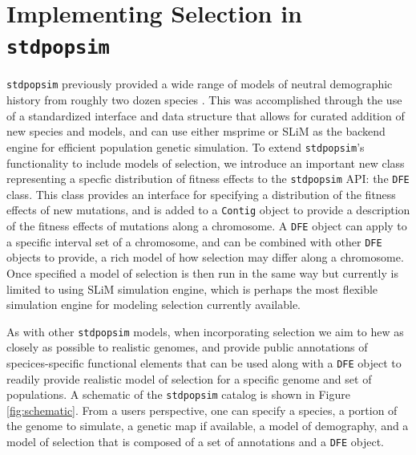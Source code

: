 \documentclass[hidelinks]{article}
\newcommand{\stdpopsim}{\texttt{stdpopsim}\xspace}
\begin{document}
\section*{Implementing Selection in \stdpopsim}
    \label{selection}

    \stdpopsim previously provided a wide range of models of neutral
    demographic history from roughly two dozen species \citep{lauterbur2023expanding}.
    This was accomplished through the use of a standardized interface
    and data structure that allows for curated addition of new
    species and models, and can use either
    msprime \citep{Baumdicker2022} or SLiM \citep{haller2019slim}
    as the backend engine for efficient population genetic simulation.
    To extend \stdpopsim's functionality to include models of selection, 
    we introduce an important new class representing a specfic distribution of fitness effects
    to the \stdpopsim API: the \texttt{DFE} class. 
    This class provides an interface for specifying
    a distribution of the fitness effects of new mutations, and
    is added to a \texttt{Contig} object to provide a description
    of the fitness effects of mutations along a chromosome.
    A \texttt{DFE} object can apply to a specific interval set of a chromosome,
    and can be combined with other \texttt{DFE} objects to provide, 
    a rich model of how selection may differ along a chromosome. 
    Once specified a model of selection is then run in the same way
    but currently is limited to using SLiM simulation engine, which
    is perhaps the most flexible simulation engine for modeling selection currently available.
    
    As with other \stdpopsim models, when incorporating selection we aim to hew as closely as possible
    to realistic genomes, and provide public annotations of specices-specific functional
    elements that can be used along with a \texttt{DFE} object to
    readily provide realistic model of selection for a specific genome and set of
    populations. A schematic of the \stdpopsim catalog is shown in Figure \ref{fig:schematic}.
    From a users perspective, one can specify a species, a portion of the genome to simulate,
    a genetic map if available, a model of demography, and a model of selection that is
    composed of a set of annotations and a \texttt{DFE} object. 
\end{document}
